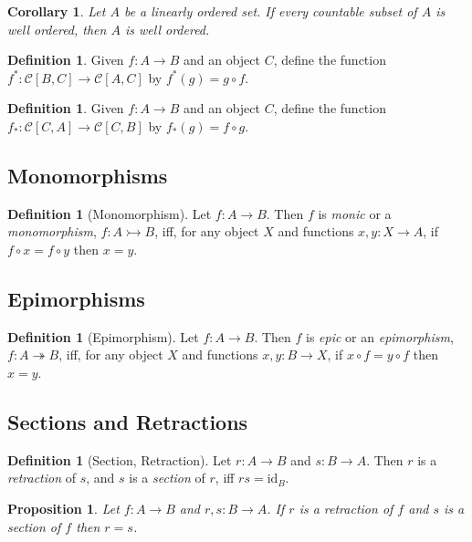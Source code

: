 \documentclass{book}
\newtheorem{prop}[ax]{Proposition}
\newtheorem{cor}{Corollary}[ax]
\theoremstyle{definition}
\newtheorem{df}[ax]{Definition}
\newcommand{\id}[1]{\ensuremath{\mathrm{id}_{#1}}}
\begin{document}
\begin{cor}
Let $A$ be a linearly ordered set. If every countable subset of $A$ is well ordered, then $A$ is well ordered.
\end{cor}

\begin{df}
Given $f : A \rightarrow B$ and an object $C$, define the function $f^* : \mathcal{C}[B,C] \rightarrow \mathcal{C}[A,C]$ by $f^*(g) = g \circ f$.
\end{df}

\begin{df}
Given $f : A \rightarrow B$ and an object $C$, define the function $f_* : \mathcal{C}[C,A] \rightarrow \mathcal{C}[C,B]$ by $f_*(g) = f \circ g$.
\end{df}

\subsection{Monomorphisms}

\begin{df}[Monomorphism]
Let $f : A \rightarrow B$. Then $f$ is \emph{monic} or a \emph{monomorphism}, $f : A \rightarrowtail B$, iff, for any object $X$ and functions $x,y : X \rightarrow A$, if $f \circ x = f \circ y$ then $x = y$.
\end{df}

\subsection{Epimorphisms}

\begin{df}[Epimorphism]
Let $f : A \rightarrow B$. Then $f$ is \emph{epic} or an \emph{epimorphism}, $f : A \twoheadrightarrow B$, iff, for any object $X$ and functions $x,y : B \rightarrow X$, if $x \circ f = y \circ f$ then $x = y$.
\end{df}

\subsection{Sections and Retractions}

\begin{df}[Section, Retraction]
Let $r : A \rightarrow B$ and $s : B \rightarrow A$. Then $r$ is a \emph{retraction} of $s$, and $s$ is a \emph{section} of $r$, iff $rs = \id{B}$.
\end{df}

\begin{prop}
\label{prop:section_is_retraction}
Let $f : A \rightarrow B$ and $r,s : B \rightarrow A$. If $r$ is a retraction of $f$ and $s$ is a section of $f$ then $r = s$.
\end{prop}
\end{document}
